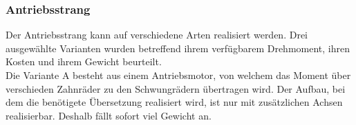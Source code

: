 ﻿\subsubsection{Antriebsstrang}

Der Antriebsstrang kann auf verschiedene Arten realisiert werden. Drei ausgewählte Varianten wurden betreffend ihrem verfügbarem Drehmoment, ihren Kosten und ihrem Gewicht beurteilt.\\
Die Variante A besteht aus einem Antriebsmotor, von welchem das Moment über verschieden Zahnräder zu den Schwungrädern übertragen wird. Der Aufbau, bei dem die benötigete Übersetzung realisiert wird, ist nur mit zusätzlichen Achsen realisierbar. Deshalb fällt sofort viel Gewicht an.





